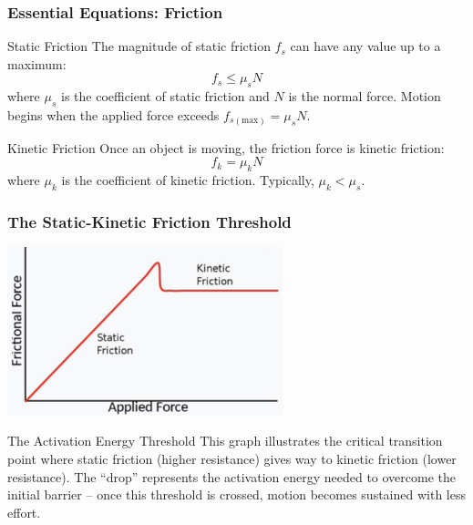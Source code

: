\documentclass{beamer}
\begin{document}
\begin{frame}
\frametitle{Essential Equations: Friction}
\begin{alertblock}{Static Friction}
The magnitude of static friction $f_s$ can have any value up to a maximum:
\[ f_s \leq \mu_s N \]
where $\mu_s$ is the coefficient of static friction and $N$ is the normal force. Motion begins when the applied force exceeds $f_{s(\text{max})} = \mu_s N$.
\end{alertblock} \pause

\begin{exampleblock}{Kinetic Friction}
Once an object is moving, the friction force is kinetic friction:
\[ f_k = \mu_k N \]
where $\mu_k$ is the coefficient of kinetic friction. Typically, $\mu_k < \mu_s$.
\end{exampleblock}
\end{frame}

\begin{frame}
\frametitle{The Static-Kinetic Friction Threshold}
\begin{center}
\includegraphics[width=0.6\textwidth]{../images/thresholdstatic-kinetic-friction.png}
\end{center}
\begin{block}{The Activation Energy Threshold}
This graph illustrates the critical transition point where static friction (higher resistance) gives way to kinetic friction (lower resistance). The ``drop'' represents the activation energy needed to overcome the initial barrier -- once this threshold is crossed, motion becomes sustained with less effort.
\end{block}
\end{frame}
\end{document}

